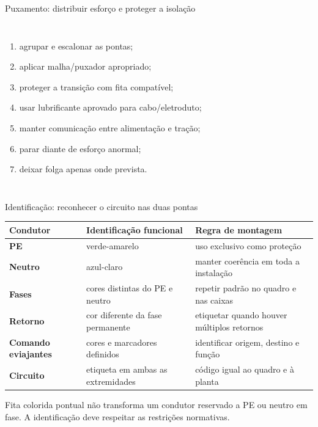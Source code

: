 \begin{frame}{Puxamento: distribuir esforço e proteger a isolação}
\small
\begin{columns}[T,onlytextwidth]
\begin{enumerate}
\item agrupar e escalonar as pontas;
\item aplicar malha/puxador apropriado;
\item proteger a transição com fita compatível;
\item usar lubrificante aprovado para cabo/eletroduto;
\item manter comunicação entre alimentação e tração;
\item parar diante de esforço anormal;
\item deixar folga apenas onde prevista.
\end{enumerate}
\end{columns}
\end{frame}

\begin{frame}{Identificação: reconhecer o circuito nas duas pontas}
\small
\begin{tabularx}{\textwidth}{>{\bfseries}p{3.1cm}X X}
\toprule
Condutor & Identificação funcional & Regra de montagem \\
\midrule
PE & verde-amarelo & uso exclusivo como proteção \\
Neutro & azul-claro & manter coerência em toda a instalação \\
Fases & cores distintas do PE e neutro & repetir padrão no quadro e nas caixas \\
Retorno & cor diferente da fase permanente & etiquetar quando houver múltiplos retornos \\
Comando e\newline viajantes & cores e marcadores definidos & identificar origem, destino e função \\
Circuito & etiqueta em ambas as extremidades & código igual ao quadro e à planta \\
\bottomrule
\end{tabularx}
\begin{caixaAt}
Fita colorida pontual não transforma um condutor reservado a PE ou neutro em fase. A identificação deve respeitar as restrições normativas.
\end{caixaAt}
\end{frame}

